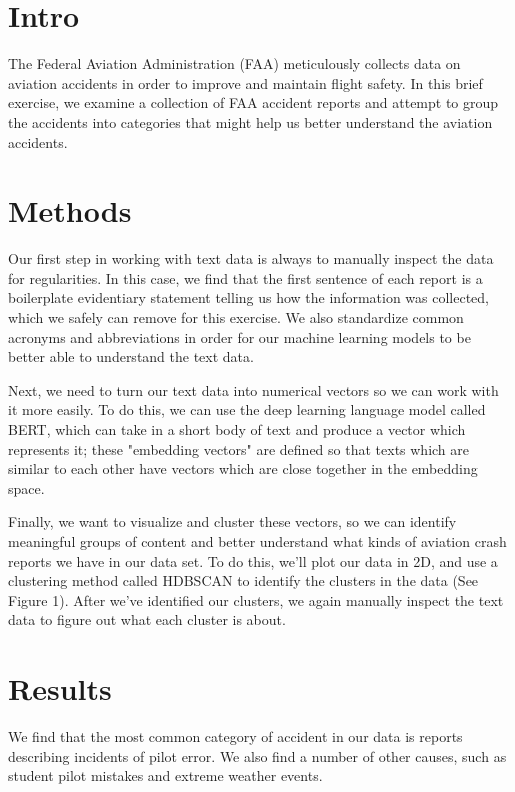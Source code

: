 \documentclass[a4paper,11pt]{article}
\begin{document}
\begin{multicols}{2}

\section{Intro}

The Federal Aviation Administration (FAA) meticulously collects data on aviation accidents in order to improve and maintain flight safety. In this brief exercise, we examine a collection of FAA accident reports and attempt to group the accidents into categories that might help us better understand the aviation accidents. 

\section{Methods}
Our first step in working with text data is always to manually inspect the data for regularities. In this case, we find that the first sentence of each report is a boilerplate evidentiary statement telling us how the information was collected, which we safely can remove for this exercise.  We also standardize common acronyms and abbreviations in order for our machine learning models to be better able to understand the text data. 

Next, we need to turn our text data into numerical vectors so we can work with it more easily.  To do this, we can use the deep learning language model called BERT, which can take in a short body of text and produce a vector which represents it; these "embedding vectors" are defined so that texts which are similar to each other have vectors which are close together in the embedding space. 

Finally, we want to visualize and cluster these vectors, so we can identify meaningful groups of content and better understand what kinds of aviation crash reports we have in our data set. To do this, we'll plot our data in 2D, and use a clustering method called HDBSCAN to identify the clusters in the data (See Figure 1). After we've identified our clusters, we again manually inspect the text data to figure out what each cluster is about. 

\section{Results}

We find that the most common category of accident in our data is reports describing incidents of pilot error.  We also find a number of other causes, such as student pilot mistakes and extreme weather events.  


\end{multicols}
\end{document}
